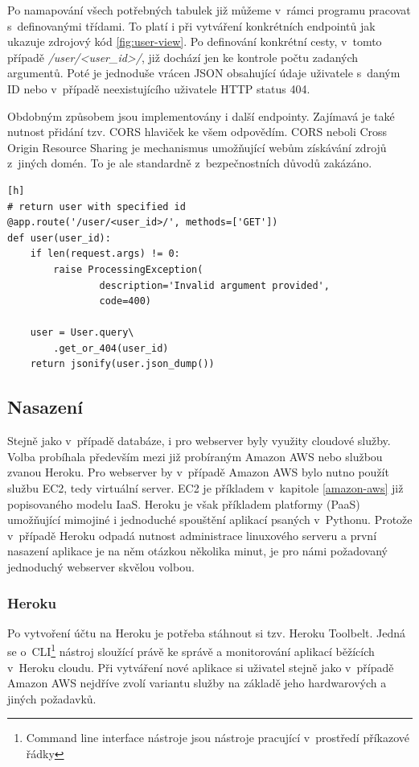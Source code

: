 \documentclass[thesis=B,czech]{FITthesis}[2012/06/26]
\begin{document}
Po namapování všech potřebných tabulek již můžeme v~rámci programu pracovat s~definovanými třídami. To platí i při vytváření konkrétních endpointů jak ukazuje zdrojový kód \ref{fig:user-view}. Po definování konkrétní cesty, v~tomto případě \textit{/user/<user\_id>/}, již dochází jen ke kontrole počtu zadaných argumentů. Poté je jednoduše vrácen JSON obsahující údaje uživatele s~daným ID nebo v~případě neexistujícího uživatele HTTP status 404. 

Obdobným způsobem jsou implementovány i další endpointy. Zajímavá je také nutnost přidání tzv. CORS hlaviček ke všem odpovědím. CORS neboli Cross Origin Resource Sharing je mechanismus umožňující webům získávání zdrojů z~jiných domén. To je ale standardně z~bezpečnostních důvodů zakázáno. 

\begin{lstlisting}[caption={Ukázka implementace konkrétního API endpointu},label=fig:user-view][h]
# return user with specified id
@app.route('/user/<user_id>/', methods=['GET'])
def user(user_id):
	if len(request.args) != 0:
		raise ProcessingException(
				description='Invalid argument provided',
				code=400)

	user = User.query\
		.get_or_404(user_id)
	return jsonify(user.json_dump())
\end{lstlisting} 

\subsection{Nasazení}
Stejně jako v~případě databáze, i pro webserver byly využity cloudové služby. Volba probíhala především mezi již probíraným Amazon AWS nebo službou zvanou Heroku\cite{heroku}. Pro webserver by v~případě Amazon AWS bylo nutno použít službu EC2, tedy virtuální server. EC2 je příkladem v~kapitole \ref{amazon-aws} již popisovaného modelu IaaS. Heroku je však příkladem platformy (PaaS) umožňující mimojiné i jednoduché spouštění aplikací psaných v~Pythonu. Protože v~případě Heroku odpadá nutnost administrace linuxového serveru a první nasazení aplikace je na něm otázkou několika minut, je pro námi požadovaný jednoduchý webserver skvělou volbou. 

\subsubsection{Heroku}
Po vytvoření účtu na Heroku je potřeba stáhnout si tzv. Heroku Toolbelt. Jedná se o~CLI\footnote{Command line interface nástroje jsou nástroje pracující v~prostředí příkazové řádky} nástroj sloužící právě ke správě a monitorování aplikací běžících v~Heroku cloudu. Při vytváření nové aplikace si uživatel stejně jako v~případě Amazon AWS nejdříve zvolí variantu služby na základě jeho hardwarových a jiných požadavků. 
\end{document}
